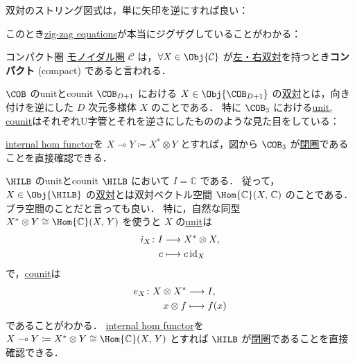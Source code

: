\documentclass[TQFT_main]{subfiles}
\begin{document}
双対のストリング図式は，単に矢印を逆にすれば良い：

このとき\hyperref[def:dual]{zig-zag equations}が本当にジグザグしていることがわかる：

\begin{mydef}[label=def:compact]{コンパクト圏}
    \hyperref[def:monoidal-category]{モノイダル圏} $\mathcal{C}$ は，$\forall X \in \Obj{\mathcal{C}}$ が\hyperref[def:dual]{左・右双対}を持つとき\textbf{コンパクト} (compact) であると言われる．
\end{mydef}

\begin{myexample}[label=ex:Cob-closed]{$\COB$ のunitとcounit}
    $\COB_{D+1}$ における $X \in \Obj{\COB_{D+1}}$ の\hyperref[def:dual]{双対}とは，向き付けを逆にした $D$ 次元多様体 $X$ のことである．
    特に $\COB_3$ における\hyperref[def:dual]{unit, counit}はそれぞれU字管とそれを逆さにしたもののような見た目をしている：

    \hyperref[def:closed-monoidal]{internal hom functor}を $X \multimap Y \coloneqq X^* \otimes Y$ とすれば，図から $\COB_{3}$ が\hyperref[def:closed-monoidal]{閉圏}であることを直接確認できる．
\end{myexample}


\begin{myexample}[label=ex:Hilb-closed]{$\HILB$ のunitとcounit}
    $\HILB$ において $I = \mathbb{C}$ である． 
    従って，$X \in \Obj{\HILB}$ の\hyperref[def:dual]{双対}とは双対ベクトル空間 $\Hom{\mathbb{C}} (X,\, \mathbb{C})$ のことである．ブラ空間のことだと言っても良い．
    特に，自然な同型 $X^* \otimes Y \cong \Hom{\mathbb{C}} (X,\, Y)$ を使うと
    $X$ の\hyperref[def:dual]{unit}は
    \begin{align}
        i_X \colon I &\longrightarrow X^* \otimes X, \\
        c &\longmapsto c\, \mathrm{id}_X
    \end{align}
    で，\hyperref[def:dual]{counit}は
    \begin{align}
        e_X \colon X \otimes X^* &\longrightarrow I, \\
        x \otimes f &\longmapsto f(x)
    \end{align}
    であることがわかる．
    \hyperref[def:closed-monoidal]{internal hom functor}を $X \multimap Y \coloneqq X^* \otimes Y \cong \Hom{\mathbb{C}}(X,\, Y)$ とすれば $\HILB$ が\hyperref[def:closed-monoidal]{閉圏}であることを直接確認できる．
\end{myexample}
\end{document}
